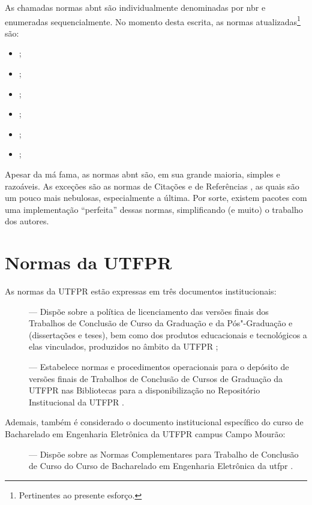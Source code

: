 As chamadas normas \ac{abnt} são individualmente denominadas por \ac{nbr} e enumeradas sequencialmente. No momento desta escrita, as normas atualizadas\footnote{Pertinentes ao presente esforço.} são:
\begin{itemize}
	\item {} \cite{NBR6023};
	\item {} \cite{NBR6024};
	\item {} \cite{NBR6027};
	\item {} \cite{NBR6028};
	\item {} \cite{NBR10520};
	\item {} \cite{NBR14724};
\end{itemize}

Apesar da má fama, as normas \ac{abnt} são, em sua grande maioria, simples e razoáveis. As exceções são as normas de Citações \cite{NBR10520} e de Referências \cite{NBR6023}, as quais são um pouco mais nebulosas, especialmente a última. Por sorte, existem pacotes com uma implementação \enquote{perfeita} dessas normas, simplificando (e muito) o trabalho dos autores.

\section{Normas da UTFPR}

As normas da UTFPR estão expressas em três documentos institucionais:
\begin{description}
	\item[] --- Dispõe sobre a política de licenciamento das versões finais dos Trabalhos de Conclusão de Curso da Graduação e da Pós"-Graduação  e  (dissertações e teses), bem como dos produtos educacionais e tecnológicos a elas vinculados, produzidos no âmbito da UTFPR \cite{cogep2021};
	\item[] --- Estabelece normas e procedimentos operacionais para o depósito de versões finais de Trabalhos de Conclusão de Cursos de Graduação da UTFPR nas Bibliotecas para a disponibilização no Repositório Institucional da UTFPR \cite{prograd2021}.
\end{description}

Ademais, também é considerado o documento institucional específico do curso de Bacharelado em Engenharia Eletrônica da UTFPR campus Campo Mourão:
\begin{description}
	\item[] --- Dispõe sobre as Normas Complementares para Trabalho de Conclusão de Curso do Curso de Bacharelado em Engenharia Eletrônica da \ac{utfpr} \cite{coele2023}.
\end{description}

